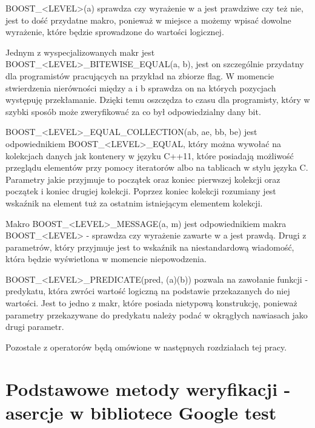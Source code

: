 \documentclass[12pt,a4paper,notitlepage]{report}
\begin{document}
BOOST{\_}<LEVEL>(a) sprawdza czy wyrażenie w a jest prawdziwe czy też nie, jest to dość przydatne makro, ponieważ w miejsce a możemy wpisać dowolne wyrażenie, które będzie sprowadzone do wartości logicznej.

Jednym z wyspecjalizowanych makr jest BOOST{\_}<LEVEL>{\_}BITEWISE{\_}EQUAL(a, b), jest on szczególnie przydatny dla programistów pracujących na przykład na zbiorze flag. W momencie stwierdzenia nierówności między a i b sprawdza on na których pozycjach występuję przekłamanie. Dzięki temu oszczędza to czasu dla programisty, który w szybki sposób może zweryfikować za co był odpowiedzialny dany bit.

BOOST{\_}<LEVEL>{\_}EQUAL{\_}COLLECTION(ab, ae, bb, be) jest odpowiednikiem BOOST{\_}<LEVEL>{\_}EQUAL, który można wywołać na kolekcjach danych jak kontenery w języku C++11, które posiadają możliwość przeglądu elementów przy pomocy iteratorów albo na tablicach w stylu języka C. Parametry jakie przyjmuje to początek oraz koniec pierwszej kolekcji oraz początek i koniec drugiej kolekcji. Poprzez koniec kolekcji rozumiany jest wskaźnik na element tuż za ostatnim istniejącym elementem kolekcji.

Makro BOOST{\_}<LEVEL>{\_}MESSAGE(a, m) jest odpowiednikiem makra BOOST{\_}<LEVEL> - sprawdza czy wyrażenie zawarte w a jest prawdą. Drugi z parametrów, który przyjmuje jest to wskaźnik na niestandardową wiadomość, która będzie wyświetlona w momencie niepowodzenia.

BOOST{\_}<LEVEL>{\_}PREDICATE(pred, (a)(b)) pozwala na zawołanie funkcji - predykatu, która zwróci wartość logiczną na podstawie przekazanych do niej wartości. Jest to jedno z makr, które posiada nietypową konstrukcję, ponieważ parametry przekazywane do predykatu należy podać w okrągłych nawiasach jako drugi parametr.

Pozostałe z operatorów będą omówione w następnych rozdziałach tej pracy.

			

\section{Podstawowe metody weryfikacji - asercje w bibliotece Google test}
\end{document}
